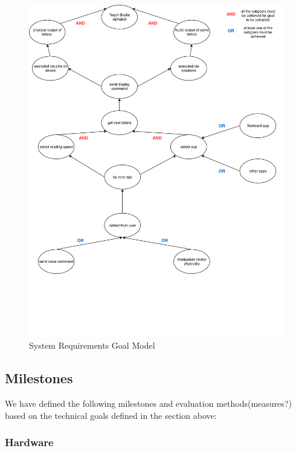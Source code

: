 \documentclass{article}
\begin{document}
\begin{figure}[h]
\vskip 5mm
\begin{center}
\centerline{\includegraphics[width=\textwidth]{figs/goalmodeling}}
\caption{System Requirements Goal Model}
\label{fig:goalmodel}
\end{center}
\vskip -5mm
\end{figure} 

\subsection{Milestones} 

We have defined the following milestones and evaluation methods(measures?) based on the technical goals defined in the section above:

\subsubsection{Hardware}
\end{document}
